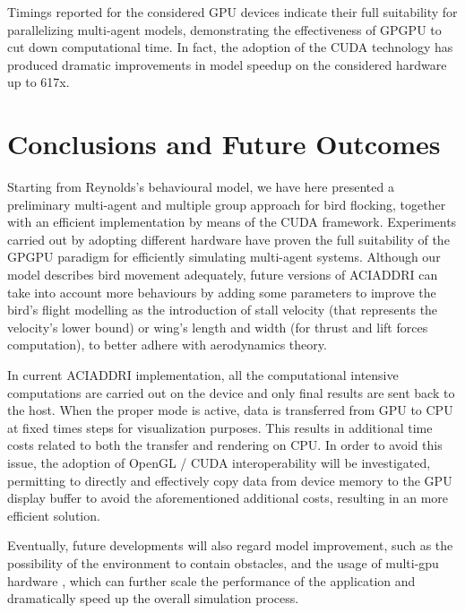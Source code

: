 Timings reported for the considered GPU devices indicate their full suitability for parallelizing multi-agent models, demonstrating the effectiveness of GPGPU to cut down computational time. In fact, the adoption of the CUDA technology has produced dramatic improvements in model speedup on the considered hardware up to 617x. 




\section{Conclusions and Future Outcomes}
\label{sect:Discussion}

Starting from Reynolds's behavioural model, we have here presented a preliminary multi-agent and multiple group approach for bird flocking, together with an efficient implementation by means of the CUDA framework. Experiments carried out by adopting different hardware have proven the full suitability of the GPGPU paradigm for efficiently simulating multi-agent systems.
Although our model describes bird movement adequately, future versions of \textsc{ACIADDRI} can take into account more behaviours by adding some parameters to improve the bird's flight modelling \cite{Dutta:2010,phys.org,Gangshan:2014} as the introduction of stall velocity (that represents the velocity's lower bound) or wing's length and width (for thrust and lift forces computation), to better adhere with aerodynamics theory. 

In current \textsc{ACIADDRI} implementation, all the computational intensive computations are carried out on the device and only final results are sent back to the host.
When the proper mode is active, data is transferred from GPU to CPU at fixed times steps for visualization purposes.
This results in additional time costs related to both the transfer and rendering on CPU.
In order to avoid this issue, the adoption of OpenGL / CUDA interoperability will be investigated, permitting to directly and effectively copy data from device memory to the GPU display buffer to avoid the aforementioned additional costs, resulting in an more efficient solution.

Eventually, future developments will also regard model improvement, such as the possibility of the environment to contain obstacles, and the usage of multi-gpu hardware \cite{Kirk2010,Cheng:2014}, which can further scale the performance of the application and dramatically speed up the overall simulation process.
